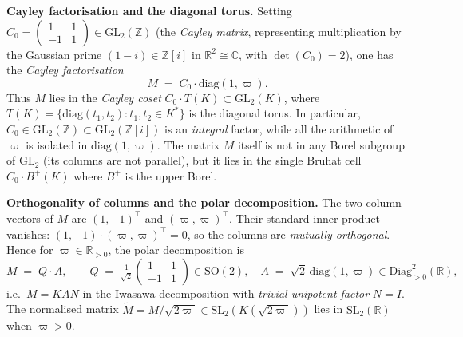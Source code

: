\begin{remark}
\medskip
\noindent\textbf{Cayley factorisation and the diagonal torus.}\;
Setting $C_0 = \begin{pmatrix}1&1\\-1&1\end{pmatrix}\in\mathrm{GL}_2(\mathbb{Z})$
(the \emph{Cayley matrix}, representing multiplication by the
Gaussian prime $(1-i)\in\mathbb{Z}[i]$ in $\mathbb{R}^2\cong\mathbb{C}$,
with $\det(C_0)=2$), one has the \emph{Cayley factorisation}
\begin{equation}\label{eq:cayley-factorization}
  M \;=\; C_0\cdot\mathrm{diag}(1,\varpi).
\end{equation}
Thus $M$ lies in the \emph{Cayley coset}
$C_0\cdot T(K)\subset\mathrm{GL}_2(K)$,
where $T(K)=\{\mathrm{diag}(t_1,t_2):t_1,t_2\in K^*\}$ is the
diagonal torus.  In particular, $C_0\in\mathrm{GL}_2(\mathbb{Z})\subset
\mathrm{GL}_2(\mathbb{Z}[i])$ is an \emph{integral} factor, while all
the arithmetic of $\varpi$ is isolated in $\mathrm{diag}(1,\varpi)$.
The matrix $M$ itself is not in any Borel subgroup of $\mathrm{GL}_2$
(its columns are not parallel), but it lies in the single Bruhat cell
$C_0\cdot B^+(K)$ where $B^+$ is the upper Borel.

\medskip
\noindent\textbf{Orthogonality of columns and the polar decomposition.}\;
The two column vectors of $M$ are $(1,-1)^{\top}$ and $(\varpi,\varpi)^{\top}$.
Their standard inner product vanishes:
$(1,-1)\cdot(\varpi,\varpi)^{\top}=0$,
so the columns are \emph{mutually orthogonal}.
Hence for $\varpi\in\mathbb{R}_{>0}$, the polar decomposition is
\begin{equation}\label{eq:polar-decomp}
  M \;=\; Q\cdot A,
  \qquad
  Q \;=\; \tfrac{1}{\sqrt{2}}\begin{pmatrix}1&1\\-1&1\end{pmatrix}
    \in\mathrm{SO}(2),
  \quad
  A \;=\; \sqrt{2}\,\mathrm{diag}(1,\varpi)\in\mathrm{Diag}_{>0}^2(\mathbb{R}),
\end{equation}
i.e.\ $M=KAN$ in the Iwasawa decomposition with \emph{trivial unipotent
factor} $N=I$.  The normalised matrix
$\widetilde{M} = M/\!\sqrt{2\varpi}\in\mathrm{SL}_2(K(\sqrt{2\varpi}))$
lies in $\mathrm{SL}_2(\mathbb{R})$ when $\varpi>0$.


\end{remark}
